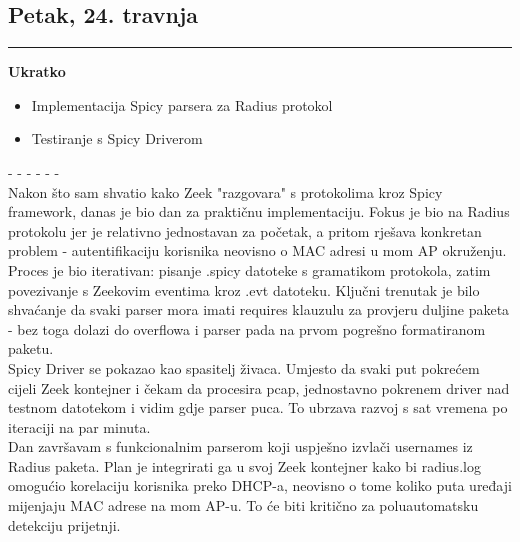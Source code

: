 \documentclass[12pt, a4paper]{article}
\newcommand{\dan}[1]{
    \subsection*{#1}
    \vspace{-0.5em} 
    \hrule \vspace{0.5em} 
}
\begin{document}
\dan{Petak, 24. travnja}
\textbf{Ukratko}
\begin{itemize}
    \item Implementacija Spicy parsera za Radius protokol
    \item Testiranje s Spicy Driverom
\end{itemize}
- - - - - - \\
Nakon što sam shvatio kako Zeek "razgovara" s protokolima kroz Spicy framework, danas je bio dan za praktičnu implementaciju. 
Fokus je bio na Radius protokolu jer je relativno jednostavan za početak, a pritom rješava konkretan problem - autentifikaciju 
korisnika neovisno o MAC adresi u mom AP okruženju.
\\
Proces je bio iterativan: pisanje .spicy datoteke s gramatikom protokola, zatim povezivanje s Zeekovim eventima kroz .evt datoteku. 
Ključni trenutak je bilo shvaćanje da svaki parser mora imati requires klauzulu za provjeru duljine paketa - bez toga dolazi do 
overflowa i parser pada na prvom pogrešno formatiranom paketu.
\\
Spicy Driver se pokazao kao spasitelj živaca. Umjesto da svaki put pokrećem cijeli Zeek kontejner i čekam da procesira pcap, 
jednostavno pokrenem driver nad testnom datotekom i vidim gdje parser puca. To ubrzava razvoj s sat vremena po iteraciji na par minuta.
\\
Dan završavam s funkcionalnim parserom koji uspješno izvlači usernames iz Radius paketa. Plan je integrirati ga u svoj Zeek 
kontejner kako bi radius.log omogućio korelaciju korisnika preko DHCP-a, neovisno o tome koliko puta uređaji mijenjaju MAC adrese na 
mom AP-u. To će biti kritično za poluautomatsku detekciju prijetnji.
\end{document}
